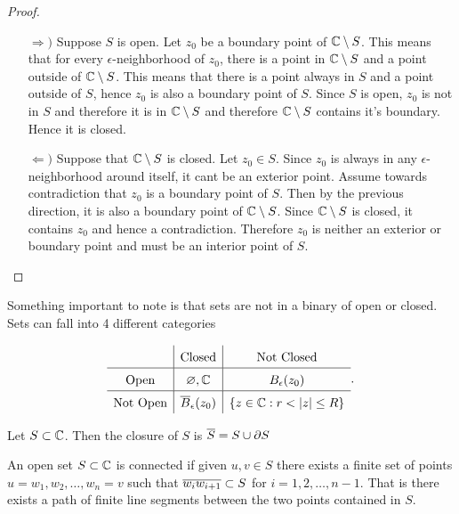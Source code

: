 \documentclass[../notes.tex]{subfiles}
\begin{document}
\begin{proof}
    \hfill\begin{enumerate}
        \item[$\Rightarrow)$] %
        Suppose $S$ is open. Let $z_0$ be a boundary point of $\mathbb{C} \setminus S$. This means that for every $\epsilon$-neighborhood of $z_0$, there is a point in $\mathbb{C} \setminus S$ and a point outside of $\mathbb{C} \setminus S$. This means that there is a point always in $S$ and a point outside of $S$, hence $z_0$ is also a boundary point of $S$. Since $S$ is open, $z_0$ is not in $S$ and therefore it is in $\mathbb{C} \setminus S$ and therefore $\mathbb{C} \setminus S$ contains it's boundary. Hence it is closed.
        \item[$\Leftarrow)$] %
        Suppose that $\mathbb{C} \setminus S$ is closed. Let $z_0 \in S$. Since $z_0$ is always in any $\epsilon$-neighborhood around itself, it cant be an exterior point. Assume towards contradiction that $z_0$ is a boundary point of $S$. Then by the previous direction, it is also a boundary point of $\mathbb{C} \setminus S$. Since $\mathbb{C} \setminus S$ is closed, it contains $z_0$ and hence a contradiction. Therefore $z_0$ is neither an exterior or boundary point and must be an interior point of $S$.
    \end{enumerate}
\end{proof}

Something important to note is that sets are not in a binary of open or closed. Sets can fall into 4 different categories

\[
    \setlength{\tabcolsep}{30pt}
    \renewcommand\arraystretch{1.5}
    \begin{array}{c|c|c}
               & \text{Closed} & \text{Not Closed} \\\hline
        \text{Open}   & \varnothing, \C & B_\epsilon(z_0) \\\hline
        \text{Not Open} & \conj{B}_\epsilon(z_0) & \qty{z \in \C : r < |z| \leq R}
    \end{array}
.\]

\begin{definition}[Closure]
    Let $S \subset \mathbb{C}$. Then the closure of $S$ is $\overline{S} = S \cup \partial S$
\end{definition}


\begin{definition}[Connectedness]
    An open set $S \subset \mathbb{C}$ is connected if given $u,v \in S$ there exists a finite set of points $u = w_1, w_2, \ldots, w_n = v$ such that $\overline{w_i w_{i+1}} \subset S$ for $i = 1,2,\ldots,n-1$. That is there exists a path of finite line segments between the two points contained in $S$.
\end{definition}
\end{document}
